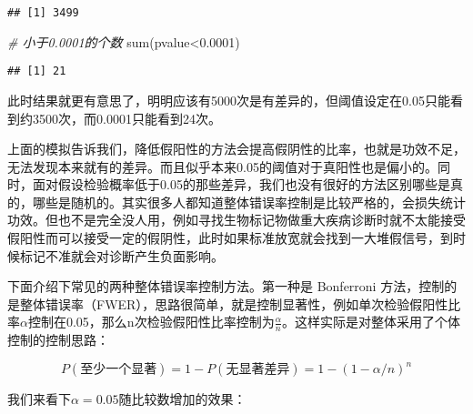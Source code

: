 \documentclass[]{tufte-book}
\newenvironment{Shaded}{}{}
\newcommand{\CommentTok}[1]{\textcolor[rgb]{0.38,0.63,0.69}{\textit{#1}}}
\newcommand{\FloatTok}[1]{\textcolor[rgb]{0.25,0.63,0.44}{#1}}
\newcommand{\FunctionTok}[1]{\textcolor[rgb]{0.02,0.16,0.49}{#1}}
\newcommand{\NormalTok}[1]{#1}
\newcommand{\SpecialCharTok}[1]{\textcolor[rgb]{0.25,0.44,0.63}{#1}}
\begin{document}
\begin{verbatim}
## [1] 3499
\end{verbatim}

\begin{Shaded}
\begin{Highlighting}[]
\CommentTok{\# 小于0.0001的个数}
\FunctionTok{sum}\NormalTok{(pvalue}\SpecialCharTok{\textless{}}\FloatTok{0.0001}\NormalTok{)}
\end{Highlighting}
\end{Shaded}

\begin{verbatim}
## [1] 21
\end{verbatim}

此时结果就更有意思了，明明应该有5000次是有差异的，但阈值设定在0.05只能看到约3500次，而0.0001只能看到24次。

上面的模拟告诉我们，降低假阳性的方法会提高假阴性的比率，也就是功效不足，无法发现本来就有的差异。而且似乎本来0.05的阈值对于真阳性也是偏小的。同时，面对假设检验概率低于0.05的那些差异，我们也没有很好的方法区别哪些是真的，哪些是随机的。其实很多人都知道整体错误率控制是比较严格的，会损失统计功效。但也不是完全没人用，例如寻找生物标记物做重大疾病诊断时就不太能接受假阳性而可以接受一定的假阴性，此时如果标准放宽就会找到一大堆假信号，到时候标记不准就会对诊断产生负面影响。

下面介绍下常见的两种整体错误率控制方法。第一种是 Bonferroni 方法，控制的是整体错误率（FWER），思路很简单，就是控制显著性，例如单次检验假阳性比率\(\alpha\)控制在0.05，那么n次检验假阳性比率控制为\(\frac{\alpha}{n}\)。这样实际是对整体采用了个体控制的控制思路：

\[
P(至少一个显著)=1-P(无显著差异) = 1-(1-\alpha/n)^n
\]

我们来看下\(\alpha = 0.05\)随比较数增加的效果：
\end{document}
